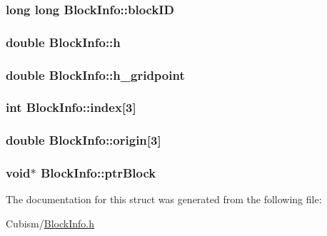 \subsubsection[{block\+I\+D}]{\setlength{\rightskip}{0pt plus 5cm}long long Block\+Info\+::block\+I\+D}\label{struct_block_info_aff4a50657c14cc550c9e0e3aaaed1a15}
\hypertarget{struct_block_info_abb250cd39311bd0a840588ff2a6196ad}{}
\subsubsection[{h}]{\setlength{\rightskip}{0pt plus 5cm}double Block\+Info\+::h}\label{struct_block_info_abb250cd39311bd0a840588ff2a6196ad}
\hypertarget{struct_block_info_a83bd46701539e64d666206d6501ee3ea}{}
\subsubsection[{h\+\_\+gridpoint}]{\setlength{\rightskip}{0pt plus 5cm}double Block\+Info\+::h\+\_\+gridpoint}\label{struct_block_info_a83bd46701539e64d666206d6501ee3ea}
\hypertarget{struct_block_info_ad32832aaa2dee35464a74abfae741572}{}
\subsubsection[{index}]{\setlength{\rightskip}{0pt plus 5cm}int Block\+Info\+::index\mbox{[}3\mbox{]}}\label{struct_block_info_ad32832aaa2dee35464a74abfae741572}
\hypertarget{struct_block_info_a8d2d03097cfbffc58d3cc2dee371e4b2}{}
\subsubsection[{origin}]{\setlength{\rightskip}{0pt plus 5cm}double Block\+Info\+::origin\mbox{[}3\mbox{]}}\label{struct_block_info_a8d2d03097cfbffc58d3cc2dee371e4b2}
\hypertarget{struct_block_info_af3655416c17becfb24a9f475a7b97d23}{}
\subsubsection[{ptr\+Block}]{\setlength{\rightskip}{0pt plus 5cm}void$\ast$ Block\+Info\+::ptr\+Block}\label{struct_block_info_af3655416c17becfb24a9f475a7b97d23}


The documentation for this struct was generated from the following file\+:\begin{DoxyCompactItemize}
\item 
Cubism/\hyperlink{_block_info_8h}{Block\+Info.\+h}\end{DoxyCompactItemize}
